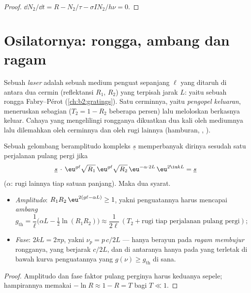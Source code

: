 \begin{proof}
$\dd N_2/\dd t = R - N_2/\tau - \sigma I N_2/h\nu = 0$.
\end{proof}

\section{Osilatornya: rongga, ambang dan ragam}

\begin{definition}\label{def:b2:laser:cavity}
Sebuah \emph{laser} adalah sebuah medium penguat sepanjang $\ell$
yang ditaruh di antara dua cermin (reflektansi $R_1$, $R_2$) yang terpisah jarak $L$:
yaitu sebuah rongga Fabry--Pérot (\cref{ch:b2:gratings}). Satu cerminnya, yaitu
\emph{pengopel keluaran}, meneruskan sebagian ($T_2 = 1 - R_2$ beberapa
persen) lalu meloloskan berkasnya keluar. Cahaya yang mengelilingi rongganya
dikuatkan dua kali oleh mediumnya lalu dilemahkan oleh cerminnya dan oleh
rugi lainnya (hamburan, , ).
\end{definition}

\begin{theorem}\label{thm:b2:laser:threshold}
Sebuah gelombang beramplitudo kompleks $\underline s$ memperbanyak dirinya sesudah satu
perjalanan pulang pergi jika
\[
\underline s\,\cdot\, \eu^{g\ell}\sqrt{R_1}\,\eu^{g\ell}\sqrt{R_2}\,
\eu^{-\alpha\cdot 2L}\,\eu^{2\iu kL} = \underline s
\]
($\alpha$: rugi lainnya tiap satuan panjang). Maka dua syarat.
\begin{itemize}
\item \emph{Amplitudo}: $R_1R_2\,\eu^{2(g\ell - \alpha L)} \ge 1$, yakni
      penguatannya harus mencapai \emph{ambang}
      \[
      g_{\text{th}} = \frac{1}{\ell}\Big(\alpha L - \tfrac12\ln(R_1R_2)\Big)
      \approx \frac{1}{2\ell}\,(T_2 + \text{rugi tiap perjalanan pulang pergi}) ;
      \]
\item \emph{Fase}: $2kL = 2\pi p$, yakni $\nu_p = p\,c/2L$ --- 
      hanya berayun pada \emph{ragam membujur}
      rongganya, yang berjarak $c/2L$, dan di antaranya hanya pada
      yang terletak di bawah kurva penguatannya yang $g(\nu) \ge g_{\text{th}}$ di sana.
\end{itemize}
\end{theorem}

\begin{proof}
Amplitudo dan fase faktor pulang perginya harus keduanya sepele;
hampirannya memakai $-\ln R \approx 1 - R = T$ bagi $T \ll 1$.
\end{proof}

